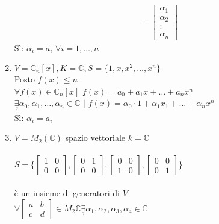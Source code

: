 \begin{enumerate}
\begin{align*}
            =
            \begin{bmatrix}
                \alpha_1\\\alpha_2\\:\\\alpha_n
            \end{bmatrix}
        \end{align*}
        Sì: $\alpha_i=a_i$  $\forall i=1,\dots,n$
    \item $V=\mathbb{C}_n[x], K=\mathbb{C}, S=\{1,x,x^2,\dots,x^n\}$\\
        Posto $f(x)\leq n$ \\
        $\forall f(x)\in\mathbb{C}_n[x]$ $f(x)=a_0+a_1x+\dots+a_nx^n$\\
        $\underset{?}{\exists}\alpha_0, \alpha_1,\dots,\alpha_n\in\mathbb{C}$ 
        $\big|$ $ f(x)=\alpha_0\cdot 1 + \alpha_1x_1+\dots+\alpha_nx^n$\\
        Sì: $\alpha_i=a_i$
    \item $V=M_2(\mathbb{C})$ spazio vettoriale $k=\mathbb{C}$ \\\\
        $S=\Bigg\{    
            \begin{bmatrix}
                1 & 0 \\
                0 & 0
            \end{bmatrix}
            ,
            \begin{bmatrix}
                0 & 1 \\
                0 & 0
            \end{bmatrix}
            ,
            \begin{bmatrix}
                0 & 0 \\
                1 & 0
            \end{bmatrix}
            ,
            \begin{bmatrix}
                0 & 0 \\
                0 & 1
            \end{bmatrix}
        \Bigg\}$\\\\
        è un insieme di generatori di $V$\\
        $\forall 
        \begin{bmatrix}
            a & b \\
            c & d
        \end{bmatrix}
        \in M_2\mathbb{C}
        \underset{?}{\exists}\alpha_1, \alpha_2, \alpha_3, \alpha_4 \in \mathbb{C}$\\

\end{enumerate}
